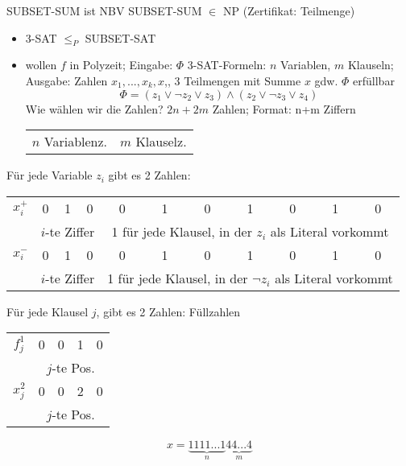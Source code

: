 \Satz SUBSET-SUM ist NBV
\Bew SUBSET-SUM $\in$ NP (Zertifikat: Teilmenge)
\begin{itemize}
 \item 3-SAT $\leq_P$ SUBSET-SAT
 \item wollen $f$ in Polyzeit; Eingabe: $\Phi$ 3-SAT-Formeln: $n$ Variablen, $m$ Klauseln; Ausgabe: Zahlen $x_1,...,x_k,x$,, 3 Teilmengen mit Summe $x$ gdw. $\Phi$ erfüllbar
 \Bsp \hfill
 \[\Phi = (z_1 \lor \neg z_2 \lor z_3) \land (z_2 \lor \neg z_3 \lor z_4)\]
 Wie wählen wir die Zahlen? $2n+2m$ Zahlen; Format: n+m Ziffern
 \begin{center}
  \begin{tabular}{|c|c|c|c|c|c||c|c|c|c|c|c|}\hline
   & & & & & & & & & & & \\\hline
   \multicolumn{6}{|c|}{$n$ Variablenz.} & \multicolumn{6}{|c|}{$m$ Klauselz.}
  \end{tabular}
 \end{center}
\end{itemize}
Für jede Variable $z_i$ gibt es 2 Zahlen:
 \begin{center}
  \begin{tabular}{c|c|c|c||c|c|c|c|c|c|c|}\cline{2-11}
   $x_i^+ $& 0 & 1 & 0 & 0 & 1 & 0 & 1 & 0 & 1 & 0 \\\cline{2-11}
   & \multicolumn{3}{c}{$i$-te Ziffer} & \multicolumn{7}{p{3.8cm}}{1 für jede Klausel, in der $z_i$ als Literal vorkommt}\\\cline{2-11}
   $x_i^- $& 0 & 1 & 0 & 0 & 1 & 0 & 1 & 0 & 1 & 0 \\\cline{2-11}
   & \multicolumn{3}{c}{$i$-te Ziffer} & \multicolumn{7}{p{3.8cm}}{1 für jede Klausel, in der $\neg z_i$ als Literal vorkommt}
  \end{tabular}
 \end{center}
 Für jede Klausel $j$, gibt es 2 Zahlen: Füllzahlen 
 \begin{center}
  \begin{tabular}{c|c|c|c|c|}\cline{2-5}
   $f_j^1 $& 0 & 0 & 1 & 0 \\\cline{2-5}
   & \multicolumn{4}{c}{$j$-te Pos.}\\\cline{2-5}
   $x_j^2 $& 0 & 0 & 2 & 0 \\\cline{2-5}
   & \multicolumn{4}{c}{$j$-te Pos.}
  \end{tabular}
 \end{center}
 \[x = \underbrace{1111...1}_{n}\underbrace{44...4}_{m}\]
 \Bsp \hfill
